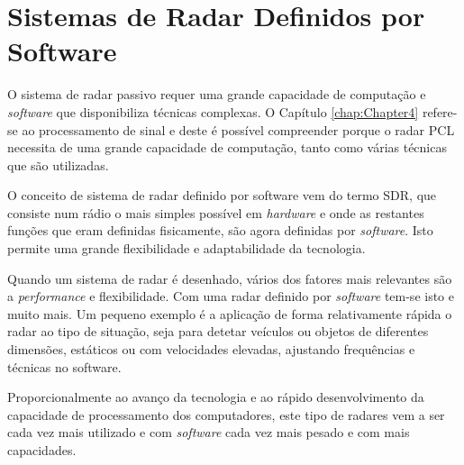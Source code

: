 \section{Sistemas de Radar Definidos por Software}
O sistema de radar passivo requer uma grande capacidade de computação e \textit{software} que disponibiliza técnicas complexas. O Capítulo \ref{chap:Chapter4} refere-se ao processamento de sinal e deste é possível compreender porque o radar \gls{PCL} necessita de uma grande capacidade de computação, tanto como várias técnicas que são utilizadas.\par 
O conceito de sistema de radar definido por software vem do termo \gls{SDR}, que consiste num rádio o mais simples possível em \textit{hardware} e onde as restantes funções que eram definidas fisicamente, são agora definidas por \textit{software}. Isto permite uma grande flexibilidade e adaptabilidade da tecnologia.\par 
Quando um sistema de radar é desenhado, vários dos fatores mais relevantes são a \textit{performance} e flexibilidade. Com uma radar definido por \textit{software} tem-se isto e muito mais. Um pequeno exemplo é a aplicação de forma relativamente rápida o radar ao tipo de situação, seja para detetar veículos ou objetos de diferentes dimensões, estáticos ou com velocidades elevadas, ajustando frequências e técnicas no software.\par 
Proporcionalmente ao avanço da tecnologia e ao rápido desenvolvimento da capacidade de processamento dos computadores, este tipo de radares vem a ser cada vez mais utilizado e com \textit{software} cada vez mais pesado e com mais capacidades.  

